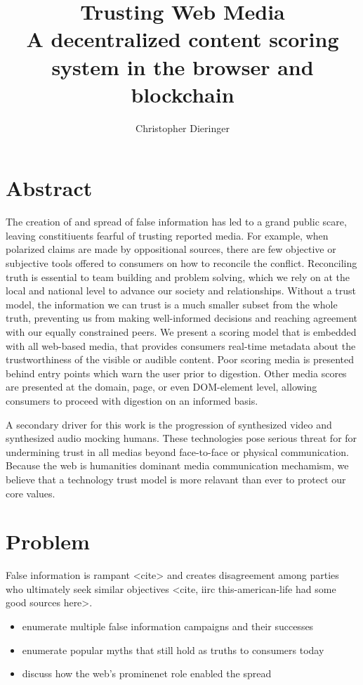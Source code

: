 \documentclass{paper}
\begin{document}
\title{%
Trusting Web Media \\
\large A decentralized content scoring system in the browser and blockchain}

\author{Christopher Dieringer}

\maketitle
\newpage

\section{Abstract}
The creation of and spread of false information has led to
a grand public scare, leaving constitiuents fearful of trusting
reported media.  For example, when polarized claims are made by oppositional
sources, there are few objective or subjective tools offered to consumers
on how to reconcile the conflict.  Reconciling truth is essential to
team building and problem solving, which we rely on at the local and national
level to advance our society and relationships.  Without a trust model, the
information we can trust is a much smaller subset from the whole truth,
preventing us from making well-informed decisions and reaching agreement with
our equally constrained peers.  We present a scoring model that is embedded with
all web-based media, that provides consumers real-time metadata about the
trustworthiness of the visible or audible content.  Poor scoring media is
presented behind entry points which warn the user prior to digestion.  Other
media scores are presented at the domain, page, or even DOM-element level,
allowing consumers to proceed with digestion on an informed basis.

A secondary driver for this work is the progression of synthesized video and
synthesized audio mocking humans.  These technologies pose serious threat for
for undermining trust in all medias beyond face-to-face or physical
communication.  Because the web is humanities dominant media communication
mechamism, we believe that a technology trust model is more relavant than ever
to protect our core values.

\section{Problem}

False information is rampant <cite> and creates disagreement among parties who
ultimately seek similar objectives <cite, iirc this-american-life had some good sources here>.
\begin{itemize}
  \item enumerate multiple false information campaigns and their successes
  \item enumerate popular myths that still hold as truths to consumers today
  \item discuss how the web's prominenet role enabled the spread
\end{itemize}
\end{document}
